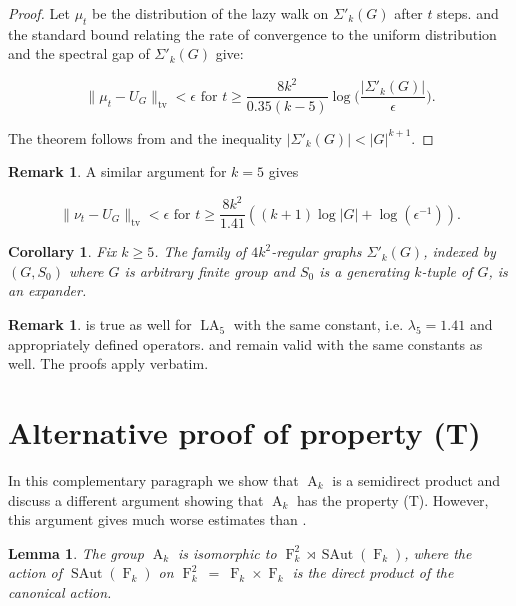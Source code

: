 \documentclass[12pt]{amsart}
\newtheorem{lemma}[theorem]{Lemma}
\newtheorem{corollary}[theorem]{Corollary}
\theoremstyle{definition}
\newtheorem{remark}[theorem]{Remark}
\numberwithin{figure}{section}
\numberwithin{table}{section}
\numberwithin{equation}{section}
\newcommand{\OP}[1]{\operatorname{#1}}
\newcommand{\SAut}{\operatorname{SAut}}
\newcommand{\F}{\operatorname{F}}
\newcommand{\A}{\operatorname{A}}
\begin{document}
\begin{proof}
Let $\mu_t$ be the distribution of the lazy walk on $\Sigma'_k(G)$ after $t$ steps.  and the standard bound relating the rate of convergence to the uniform distribution and the spectral gap of $\Sigma'_k(G)$ \cite[Chapter 12]{MR2466937} give:

$$
\|\mu_t - U_G\|_{\mathrm{tv}} < \epsilon \text{ for } t \geq \frac{8k^2}{0.35(k-5)}\log\Big(\frac{|\Sigma'_k(G)|}{\epsilon}\Big).
$$

The theorem follows from  and the inequality $|\Sigma'_k(G)| < |G|^{k+1}$.

\end{proof}

\begin{remark}
A similar argument for $k=5$ gives

$$
\|\nu_t - U_G\|_{\mathrm{tv}} < \epsilon \text{ for } t \geq \frac{8k^2}{1.41}((k+1)\log|G| + \log(\epsilon^{-1})).
$$

\end{remark}

\begin{corollary}
Fix $k \geq 5$. The family of $4k^2$-regular graphs $\Sigma'_k(G)$, indexed by $(G,S_0)$ where $G$ is arbitrary finite group and $S_0$ is a generating $k$-tuple of $G$, is an expander. 
\end{corollary}

\begin{remark}
 is true as well for $\OP{LA}_5$ with the same constant, i.e. $\lambda_5 = 1.41$ and appropriately defined operators.  and  remain valid with the same constants as well. The proofs apply verbatim. 
\end{remark}

\section{Alternative proof of property (T)}\label{s:semidirect}

In this complementary paragraph we show that $\A_k$ is a semidirect product and discuss a different argument showing that $\A_k$ has the property (T). However, this argument gives much worse estimates than .

\begin{lemma}
The group $\A_k$ is isomorphic to $\F_k^2 \rtimes \SAut(\F_k)$, where the action of $\SAut(\F_k)$ on $\F_k^2~=~\F_k \times \F_k$ is the direct product of the canonical action. 
\end{lemma}
\end{document}
